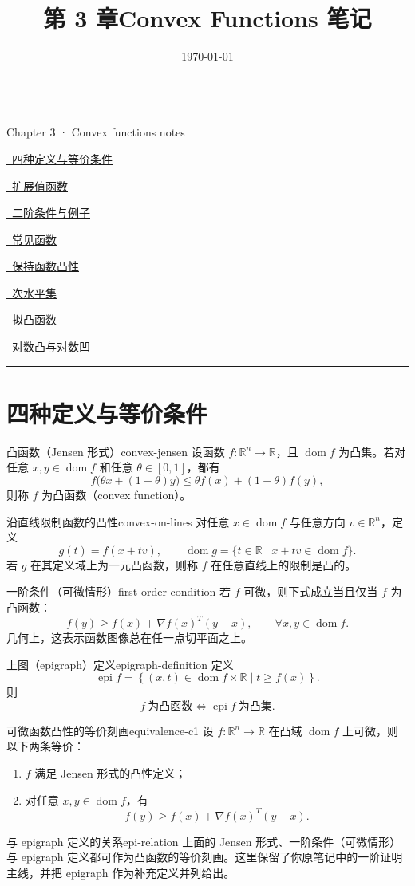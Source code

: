 \documentclass[11pt,a4paper]{article}
\title{第 3 章\quad Convex Functions 笔记}
\author{}
\date{\today}
\makeatletter
\newcommand{\makeChapterThreeTitle}{%
  \begin{tcolorbox}[
    colback=mydarkblue!5, colframe=mydarkblue!10,
    arc=3pt, boxrule=0.5pt,
    left=5pt, right=5pt, top=5pt, bottom=5pt
  ]
    {\large\bfseries\@title}\hfill{\small\@author}\\[-2pt]
    {\tiny\color{gray}\@date\hfill Chapter 3 · Convex functions notes}
  \end{tcolorbox}
  \vspace{-0.6em}
}
\newcommand{\horizontalTOCChThree}{%
  \begin{center}
  \begin{tcbraster}[
    raster columns=3, raster width=\linewidth,
    raster column skip=1mm, raster equal height
  ]
    \begin{tabNavBoxSmall}
      \hyperref[sec:ch3-three-defs]{\ 四种定义与等价条件}
    \end{tabNavBoxSmall}
    \begin{tabNavBoxSmall}
      \hyperref[sec:ch3-extension]{\ 扩展值函数}
    \end{tabNavBoxSmall}
    \begin{tabNavBoxSmall}
      \hyperref[sec:ch3-second-order]{\ 二阶条件与例子}
    \end{tabNavBoxSmall}
    \begin{tabNavBoxSmall}
      \hyperref[sec:ch3-common-functions]{\ 常见函数}
    \end{tabNavBoxSmall}
    \begin{tabNavBoxSmall}
      \hyperref[sec:ch3-preserve-convexity]{\ 保持函数凸性}
    \end{tabNavBoxSmall}
    \begin{tabNavBoxSmall}
      \hyperref[sec:ch3-sublevel]{\ 次水平集}
    \end{tabNavBoxSmall}
    \begin{tabNavBoxSmall}
      \hyperref[sec:ch3-quasiconvex]{\ 拟凸函数}
    \end{tabNavBoxSmall}
    \begin{tabNavBoxSmall}
      \hyperref[sec:ch3-logconvex]{\ 对数凸与对数凹}
    \end{tabNavBoxSmall}
  \end{tcbraster}
  \vspace{-2.5pt}%
  \noindent\textcolor{gray!30}{\rule{\linewidth}{1pt}}
  \end{center}
  \vspace{1.2em}
}
\makeatother
\begin{document}
\makeChapterThreeTitle
\horizontalTOCChThree

\section{四种定义与等价条件}\label{sec:ch3-three-defs}

\begin{definition}{凸函数（Jensen 形式）}{convex-jensen}
设函数 $f:\mathbb{R}^n\to\mathbb{R}$，且 $\operatorname{dom}f$ 为凸集。若对任意
$x,y\in\operatorname{dom}f$ 和任意 $\theta\in[0,1]$，都有
\[
f\!\bigl(\theta x+(1-\theta)y\bigr)
\le
\theta f(x)+(1-\theta)f(y),
\]
则称 $f$ 为凸函数（convex function）。
\end{definition}

\begin{definition}{沿直线限制函数的凸性}{convex-on-lines}
对任意 $x\in\operatorname{dom}f$ 与任意方向 $v\in\mathbb{R}^n$，定义
\[
g(t)=f(x+tv),\qquad
\operatorname{dom}g=\{t\in\mathbb{R}\mid x+tv\in\operatorname{dom}f\}.
\]
若 $g$ 在其定义域上为一元凸函数，则称 $f$ 在任意直线上的限制是凸的。
\end{definition}

\begin{definition}{一阶条件（可微情形）}{first-order-condition}
若 $f$ 可微，则下式成立当且仅当 $f$ 为凸函数：
\[
f(y)\ge f(x)+\nabla f(x)^T(y-x),\qquad
\forall x,y\in\operatorname{dom}f.
\]
几何上，这表示函数图像总在任一点切平面之上。
\end{definition}

\begin{definition}{上图（epigraph）定义}{epigraph-definition}
定义
\[
\operatorname{epi}f
=
\left\{(x,t)\in\operatorname{dom}f\times\mathbb{R}\mid t\ge f(x)\right\}.
\]
则
\[
f\ \text{为凸函数}
\iff
\operatorname{epi}f\ \text{为凸集}.
\]
\end{definition}

\begin{theorem}{可微函数凸性的等价刻画}{equivalence-c1}
设 $f:\mathbb{R}^n\to\mathbb{R}$ 在凸域 $\operatorname{dom}f$ 上可微，则以下两条等价：
\begin{enumerate}[label=(\arabic*)]
  \item $f$ 满足 Jensen 形式的凸性定义；
  \item 对任意 $x,y\in\operatorname{dom}f$，有
  \[
  f(y)\ge f(x)+\nabla f(x)^T(y-x).
  \]
\end{enumerate}
\end{theorem}

\begin{remark}{与 epigraph 定义的关系}{epi-relation}
上面的 Jensen 形式、一阶条件（可微情形）与 epigraph 定义都可作为凸函数的等价刻画。这里保留了你原笔记中的一阶证明主线，并把 epigraph 作为补充定义并列给出。
\end{remark}
\end{document}
